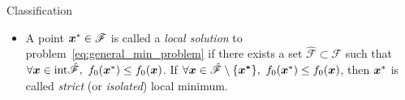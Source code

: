 \begin{note}{Classification}
\begin{enumerate}
\begin{itemize}
                \item A point \(\boldsymbol{x}^* \in \mathscr{F}\) is called a \emph{local solution} to problem~\ref{eq:general_min_problem} if there exists a set \(\hat{\mathscr{F}} \subset \mathscr{F}\) such that \(\forall \boldsymbol{x} \in \mathrm{int}\hat{\mathscr{F}}, ~f_0(\boldsymbol{x}^*) \le f_0(\boldsymbol{x})\). If \(\forall \boldsymbol{x} \in \hat{\mathscr{F}} \setminus \{\boldsymbol{{x}^*}\}, ~f_0(\boldsymbol{x}^*) \le f_0(\boldsymbol{x})\), then \(\boldsymbol{x}^*\) is called \emph{strict} (or \emph{isolated}) local minimum.
            \end{itemize}
    \end{enumerate}
\end{note}